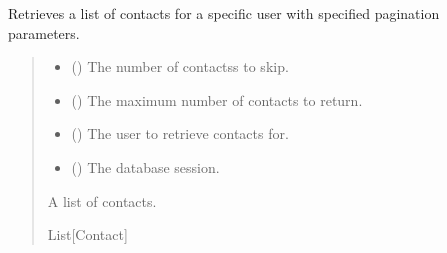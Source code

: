 \documentclass[letterpaper,10pt,english]{sphinxmanual}
\begin{document}
\begin{fulllineitems}
\label{\detokenize{index:src.repository.contacts.get_contacts}}
\pysigstartsignatures
{}
\pysigstopsignatures
\sphinxAtStartPar
Retrieves a list of contacts for a specific user with specified pagination parameters.
\begin{quote}\begin{description}
\begin{itemize}
\item {} 
\sphinxAtStartPar
{} () \textendash{} The number of contactss to skip.

\item {} 
\sphinxAtStartPar
{} () \textendash{} The maximum number of contacts to return.

\item {} 
\sphinxAtStartPar
{} () \textendash{} The user to retrieve contacts for.

\item {} 
\sphinxAtStartPar
{} () \textendash{} The database session.

\end{itemize}

\sphinxAtStartPar
A list of contacts.

\sphinxAtStartPar
List{[}Contact{]}

\end{description}\end{quote}

\end{fulllineitems}
\end{document}
